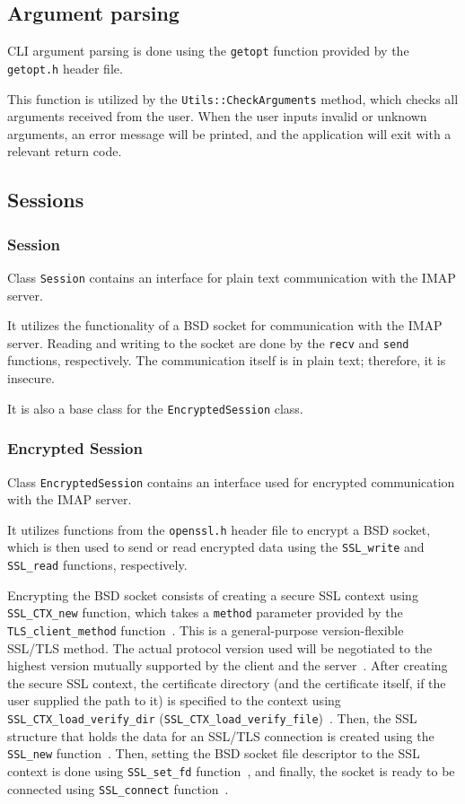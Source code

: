 \documentclass[11pt, a4paper]{article}
\begin{document}
\subsection{Argument parsing}

CLI argument parsing is done using the \verb|getopt| function provided by the \verb|getopt.h| header file.

\medskip
This function is utilized by the \verb|Utils::CheckArguments| method, which checks all arguments received from the user. When the user inputs invalid or unknown arguments, an error message will be printed, and the application will exit with a relevant return code.

\subsection{Sessions}
\subsubsection{Session}

Class \verb|Session| contains an interface for plain text communication with the IMAP server.

It utilizes the functionality of a BSD socket for communication with the IMAP server. Reading and writing to the socket are done by the \verb|recv| and \verb|send| functions, respectively. The communication itself is in plain text; therefore, it is insecure.

It is also a base class for the \verb|EncryptedSession| class.

\subsubsection{Encrypted Session}
Class \verb|EncryptedSession| contains an interface used for encrypted communication with the IMAP server.

It utilizes functions from the \verb|openssl.h| header file to encrypt a BSD socket, which is then used to send or read encrypted data using the \verb|SSL_write| and \verb|SSL_read| functions, respectively.

Encrypting the BSD socket consists of creating a secure SSL context using \verb|SSL_CTX_new| function, which takes a \verb|method| parameter provided by the \verb|TLS_client_method| function~\cite{NewSSLContext}. This is a general-purpose version-flexible SSL/TLS method. The actual protocol version used will be negotiated to the highest version mutually supported by the client and the server~\cite{ClientMethod}. After creating the secure SSL context, the certificate directory (and the certificate itself, if the user supplied the path to it) is specified to the context using \verb|SSL_CTX_load_verify_dir| (\verb|SSL_CTX_load_verify_file|)~\cite{VerifyLocations}. Then, the SSL structure that holds the data for an SSL/TLS connection is created using the \verb|SSL_new| function~\cite{SSLNew}. Then, setting the BSD socket file descriptor to the SSL context is done using \verb|SSL_set_fd| function~\cite{SSLSetFd}, and finally, the socket is ready to be connected using \verb|SSL_connect| function~\cite{SSLConnect}.
\end{document}
